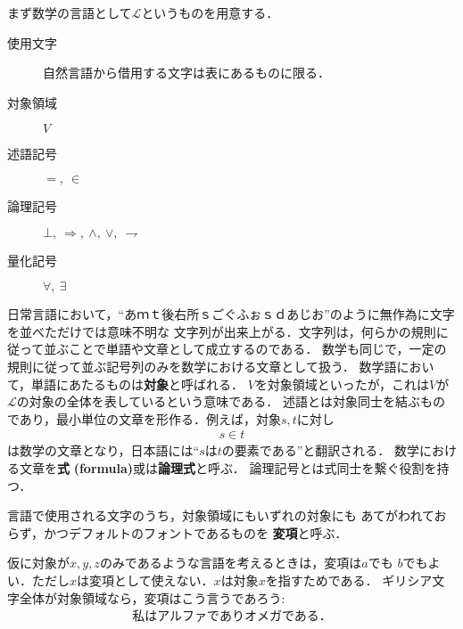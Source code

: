 	まず数学の言語として$\mathcal{L}$というものを用意する．
	\begin{description}
		\item[使用文字] 自然言語から借用する文字は表にあるものに限る．
		\item[対象領域] $V$
		\item[述語記号] $=,\ \in$
		\item[論理記号] $\bot,\ \Longrightarrow,\ \wedge,\ \vee,\ \rightharpoondown$
		\item[量化記号] $\forall,\ \exists$
	\end{description}
	
	日常言語において，``あｍｔ後右所ｓごぐふぉｓｄあじお''のように無作為に文字を並べただけでは意味不明な
	文字列が出来上がる．文字列は，何らかの規則に従って並ぶことで単語や文章として成立するのである．
	数学も同じで，一定の規則に従って並ぶ記号列のみを数学における文章として扱う．
	数学語において，単語にあたるものは{\bf 対象}と呼ばれる．
	$V$を対象領域といったが，これは$V$が$\mathcal{L}$の対象の全体を表しているという意味である．
	述語とは対象同士を結ぶものであり，最小単位の文章を形作る．例えば，対象$s,t$に対し
	\begin{align}
		s \in t
	\end{align}
	は数学の文章となり，日本語には``$s$は$t$の要素である''と翻訳される．
	数学における文章を{\bf 式}
	{\bf (formula)}或は{\bf 論理式}と呼ぶ．
	論理記号とは式同士を繋ぐ役割を持つ．
	
	\begin{screen}
		\begin{dfn}[変項]
			言語で使用される文字のうち，対象領域にもいずれの対象にも
			あてがわれておらず，かつデフォルトのフォントであるものを
			{\bf 変項}と呼ぶ．
		\end{dfn}
	\end{screen}
	
	仮に対象が$x,y,z$のみであるような言語を考えるときは，変項は$a$でも
	$b$でもよい．ただし$x$は変項として使えない．$x$は対象$x$を指すためである．
	ギリシア文字全体が対象領域なら，変項はこう言うであろう:
	\begin{align}
		\mbox{私はアルファでありオメガである．}
	\end{align}
	
	
